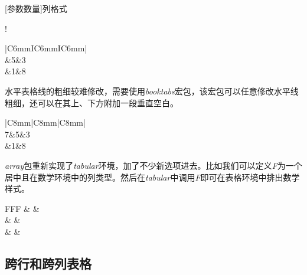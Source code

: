 \begin{latex}
\newcolumntype{新选项名称}[参数数量]{列格式}
\end{latex}

\begin{codeshow}
    \centering
    \newcolumntype{I}
        {!{\vrule width 2pt}}
    \begin{tabular}
        {|C{6mm}IC{6mm}IC{6mm}|}
        \hline 
        \\
        &5&3\\
        &1&8\\
        \hline
    \end{tabular}
\end{codeshow}

水平表格线的粗细较难修改，需要使用\emph{booktabs}宏包，该宏包可以任意修改水平线粗细，还可以在其上、下方附加一段垂直空白。

\begin{codeshow}
    \centering
    \begin{tabular}
        {|C{8mm}|C{8mm}|C{8mm}|}
        \hline 
        \\
        \specialrule{2pt}{0pt}{0pt}
        7&5&3\\
        &1&8\\
        \hline
    \end{tabular}
\end{codeshow}

\emph{array}包重新实现了\emph{tabular}环境，加了不少新选项进去。比如我们可以定义\emph{F}为一个居中且在数学环境中的列类型。然后在\emph{tabular}中调用\emph{F}即可在表格环境中排出数学样式。

\begin{codeshow}
\centering
{}
\begin{tabular}{FFF}
    \alpha & \beta    & \gamma   \\
    \delta & \epsilon & \upsilon \\
    \sigma & \tau     & \phi     \\
\end{tabular}
\end{codeshow}

\subsection{跨行和跨列表格}

